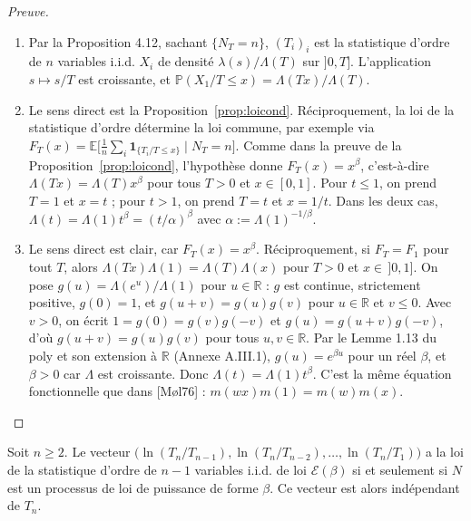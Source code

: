 \begin{proof}[Preuve]
\begin{enumerate}
\item Par la Proposition 4.12, sachant $\{N_T=n\}$, $(T_i)_i$ est la statistique d'ordre de $n$ variables i.i.d. $X_i$ de densité $\lambda(s)/\Lambda(T)$ sur $]0,T]$. L'application $s\mapsto s/T$ est croissante, et $\mathbb{P}(X_1/T\le x)=\Lambda(Tx)/\Lambda(T)$.
\item Le sens direct est la Proposition~\ref{prop:loicond}. Réciproquement, la loi de la statistique d'ordre détermine la loi commune, par exemple via $F_T(x)=\mathbb{E}\big[\frac1n\sum_i\mathbf{1}_{\{T_i/T\le x\}}\mid N_T=n\big]$. Comme dans la preuve de la Proposition~\ref{prop:loicond}, l'hypothèse donne $F_T(x)=x^\beta$, c'est-à-dire $\Lambda(Tx)=\Lambda(T)x^\beta$ pour tous $T>0$ et $x\in[0,1]$. Pour $t\le1$, on prend $T=1$ et $x=t$ ; pour $t>1$, on prend $T=t$ et $x=1/t$. Dans les deux cas, $\Lambda(t)=\Lambda(1)t^\beta=(t/\alpha)^\beta$ avec $\alpha:=\Lambda(1)^{-1/\beta}$.
\item Le sens direct est clair, car $F_T(x)=x^\beta$. Réciproquement, si $F_T=F_1$ pour tout $T$, alors $\Lambda(Tx)\Lambda(1)=\Lambda(T)\Lambda(x)$ pour $T>0$ et $x\in\,]0,1]$. On pose $g(u)=\Lambda(e^u)/\Lambda(1)$ pour $u\in\mathbb{R}$ : $g$ est continue, strictement positive, $g(0)=1$, et $g(u+v)=g(u)g(v)$ pour $u\in\mathbb{R}$ et $v\le0$. Avec $v>0$, on écrit $1=g(0)=g(v)g(-v)$ et $g(u)=g(u+v)g(-v)$, d'où $g(u+v)=g(u)g(v)$ pour tous $u,v\in\mathbb{R}$. Par le Lemme 1.13 du poly et son extension à $\mathbb{R}$ (Annexe A.III.1), $g(u)=e^{\beta u}$ pour un réel $\beta$, et $\beta>0$ car $\Lambda$ est croissante. Donc $\Lambda(t)=\Lambda(1)t^\beta$. C'est la même équation fonctionnelle que dans [Møl76] : $m(wx)m(1)=m(w)m(x)$.
\end{enumerate}
\end{proof}

\begin{theoreme}\label{thm:moller}
Soit $n\ge2$. Le vecteur $\big(\ln(T_n/T_{n-1}),\ln(T_n/T_{n-2}),\dots,\ln(T_n/T_1)\big)$ a la loi de la statistique d'ordre de $n-1$ variables i.i.d. de loi $\mathcal{E}(\beta)$ si et seulement si $N$ est un processus de loi de puissance de forme $\beta$. Ce vecteur est alors indépendant de $T_n$.
\end{theoreme}

